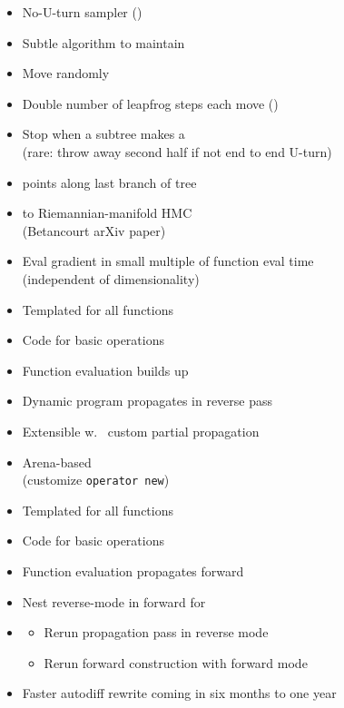 \documentclass[10pt]{report}
\newcommand{\sld}[1]{\newpage{\noindent\LARGE \ \ \
    \textcolor{MidnightBlue}{\bfseries #1}}\vspace*{4pt}}
\newcommand{\code}[1]{{\tt #1}}
\newcommand{\myemph}[1]{{\color{MidnightBlue}{\bfseries #1}}}
\begin{document}
\sld{Adapting HMC During Sampling}

\begin{itemize}
\item No-U-turn sampler (\myemph{NUTS})
\item Subtle algorithm to maintain \myemph{detailed balance}
\item Move randomly \myemph{forward or backward in time}
\item Double number of leapfrog steps each move (\myemph{binary tree})
\item Stop when a subtree makes a \myemph{U-turn}
\\ {\footnotesize (rare: throw away second half if not end to end U-turn)}
\item \myemph{Slice sample} points along last branch of tree
\item \myemph{Generalized} to Riemannian-manifold HMC
\\ {\footnotesize (Betancourt arXiv paper)}
\end{itemize}

\sld{Reverse-Mode Auto Diff}
\begin{itemize}
\item Eval gradient in small multiple of function eval time
\\
{\footnotesize (independent of dimensionality)}
\item Templated \myemph{C++ overload} for all functions
\item Code \myemph{partial derivatives} for basic operations
\item Function evaluation builds up \myemph{expression tree}
\item Dynamic program propagates \myemph{chain rule} in reverse pass
\item Extensible w.\ \myemph{object-oriented} custom partial propagation
\item Arena-based \myemph{memory management}
\\ {\footnotesize (customize \code{operator new})}
\end{itemize}

\sld{Forward-Mode Auto Diff}
\begin{itemize}
\item Templated \myemph{C++ overload} for all functions
\item Code \myemph{partial derivatives} for basic operations
\item Function evaluation propagates \myemph{chain rule} forward
\item Nest reverse-mode in forward for \myemph{higher-order}
\item \myemph{Jacobians}
\vspace*{-4pt}
\begin{itemize}\small
\item Rerun propagation pass in reverse mode
\item Rerun forward construction with forward mode
\end{itemize}
\vfill
\item Faster autodiff rewrite coming in six months to one year
\end{itemize}
\end{document}
